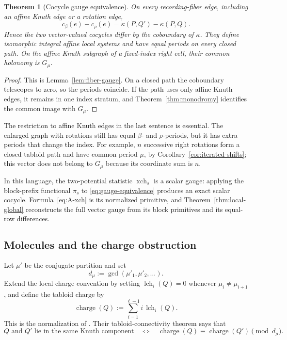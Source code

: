 \documentclass[11pt]{article}
\newtheorem{theorem}{Theorem}[section]
\theoremstyle{definition}
\theoremstyle{remark}
\newcommand{\lch}{\operatorname{lch}}
\newcommand{\xch}{\operatorname{xch}}
\begin{document}
\begin{theorem}[Cocycle gauge equivalence]\label{thm:gauge-equivalence}
On every recording-fiber edge, including an affine Knuth edge or a rotation edge,
\begin{equation}\label{eq:gauge-equivalence}
 c_\beta(e)-c_\rho(e)
   =\kappa(P,Q')-\kappa(P,Q).
\end{equation}
Hence the two vector-valued cocycles differ by the coboundary of \(\kappa\).  They
define isomorphic integral affine local systems and have equal periods on every closed
path.  On the affine Knuth subgraph of a fixed-index right cell, their common holonomy
is \(G_\mu\).
\end{theorem}

\begin{proof}
This is Lemma~\ref{lem:fiber-gauge}.  On a closed path the coboundary telescopes to
zero, so the periods coincide.  If the path uses only affine Knuth edges, it remains in
one index stratum, and Theorem~\ref{thm:monodromy} identifies the common image with
\(G_\mu\).
\end{proof}

The restriction to affine Knuth edges in the last sentence is essential.  The enlarged
graph with rotations still has equal \(\beta\)- and \(\rho\)-periods, but it has extra
periods that change the index.  For example, \(n\) successive right rotations form a
closed tabloid path and have common period \(\mu\), by
Corollary~\ref{cor:iterated-shifts}; this vector does not belong to \(G_\mu\) because
its coordinate sum is \(n\).

In this language, the two-potential statistic \(\xch_s\) is a scalar gauge: applying the
block-prefix functional \(\pi_s\) to \eqref{eq:gauge-equivalence} produces an exact
scalar cocycle.  Formula~\eqref{eq:A-xch} is its normalized primitive, and
Theorem~\ref{thm:local-global} reconstructs the full vector gauge from its block
primitives and its equal-row differences.

\subsection{Molecules and the charge obstruction}

Let \(\mu'\) be the conjugate partition and set
\begin{equation}\label{eq:dmu}
 d_\mu:=\gcd(\mu'_1,\mu'_2,\ldots).
\end{equation}
Extend the local-charge convention by setting \(\lch_i(Q)=0\) whenever
\(\mu_i\ne\mu_{i+1}\), and define the tabloid charge by
\begin{equation}\label{eq:tabloid-charge}
 \operatorname{charge}(Q):=\sum_{i=1}^{\ell-1}i\,\lch_i(Q).
\end{equation}
This is the normalization of \cite[Definition~8.3]{CLP18}.  Their
tabloid-connectivity theorem \cite[Theorem~8.6]{CLP18} says that
\begin{equation}\label{eq:charge-components}
 Q\text{ and }Q'\text{ lie in the same Knuth component}
 \quad\Longleftrightarrow\quad
 \operatorname{charge}(Q)\equiv\operatorname{charge}(Q')\pmod{d_\mu}.
\end{equation}
\end{document}
